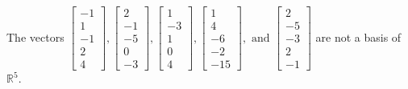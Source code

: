 \begin{exercise}
\begin{exerciseStatement}
  \end{exerciseStatement}
  \begin{exerciseAnswer}
   The vectors \(\left[\begin{array}{r}
-1 \\
1 \\
-1 \\
2 \\
4
\end{array}\right] , \left[\begin{array}{r}
2 \\
-1 \\
-5 \\
0 \\
-3
\end{array}\right] , \left[\begin{array}{r}
1 \\
-3 \\
1 \\
0 \\
4
\end{array}\right] , \left[\begin{array}{r}
1 \\
4 \\
-6 \\
-2 \\
-15
\end{array}\right] , \text{ and } \left[\begin{array}{r}
2 \\
-5 \\
-3 \\
2 \\
-1
\end{array}\right]\) 
  	 are not  a basis of \(\mathbb{R}^5\).
  


  \end{exerciseAnswer}
\end{exercise}